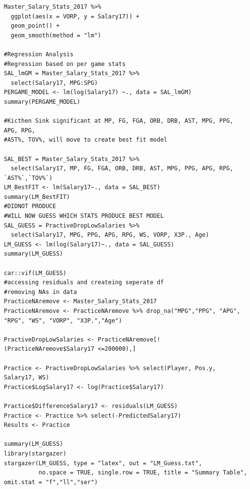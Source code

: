\documentclass[12pt,english]{article}
\begin{document}
\begin{singlespace}
\begin{lstlisting}
Master_Salary_Stats_2017 %>%
  ggplot(aes(x = VORP, y = Salary17)) +
  geom_point() +
  geom_smooth(method = "lm")

#Regression Analysis
#Regression based on per game stats
SAL_lmGM = Master_Salary_Stats_2017 %>%
  select(Salary17, MPG:SPG)
PERGAME_MODEL <- lm(log(Salary17) ~., data = SAL_lmGM)
summary(PERGAME_MODEL)

#Kicthen Sink significant at MP, FG, FGA, ORB, DRB, AST, MPG, PPG, APG, RPG,
#AST%, TOV%, will move to create best fit model

SAL_BEST = Master_Salary_Stats_2017 %>%
  select(Salary17, MP, FG, FGA, ORB, DRB, AST, MPG, PPG, APG, RPG, `AST%`,`TOV%`)
LM_BestFIT <- lm(Salary17~., data = SAL_BEST)
summary(LM_BestFIT)
#DIDNOT PRODUCE 
#WILL NOW GUESS WHICH STATS PRODUCE BEST MODEL
SAL_GUESS = PractiveDropLowSalaries %>%
  select(Salary17, MPG, PPG, APG, RPG, WS, VORP, X3P., Age)
LM_GUESS <- lm(log(Salary17)~., data = SAL_GUESS)
summary(LM_GUESS)

car::vif(LM_GUESS)
#accessing residuals and createing seperate df
#removing NAs in data
PracticeNAremove <- Master_Salary_Stats_2017
PracticeNAremove <- PracticeNAremove %>% drop_na("MPG","PPG", "APG", "RPG", "WS", "VORP", "X3P.","Age")

PractiveDropLowSalaries <- PracticeNAremove[!(PracticeNAremove$Salary17 <=200000),]

Practice <- PractiveDropLowSalaries %>% select(Player, Pos.y, Salary17, WS)
Practice$LogSalary17 <- log(Practice$Salary17)

Practice$DifferenceSalary17 <- residuals(LM_GUESS)
Practice <- Practice %>% select(-PredictedSalary17)
Results <- Practice

summary(LM_GUESS)
library(stargazer)
stargazer(LM_GUESS, type = "latex", out = "LM_Guess.txt",
          no.space = TRUE, single.row = TRUE, title = "Summary Table", omit.stat = "f","ll","ser")


\end{lstlisting}
\end{singlespace}
\end{document}
